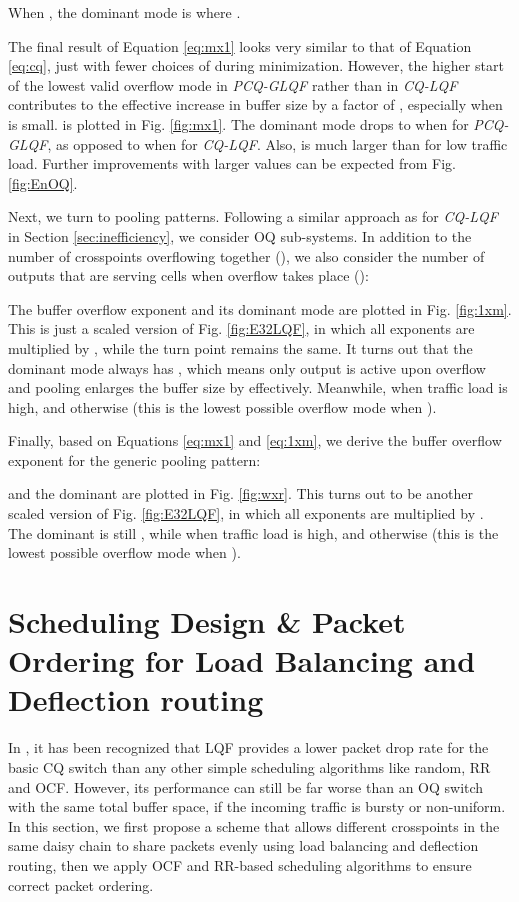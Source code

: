 \documentclass[journal,final,doublecolumn,10pt,twoside]{IEEEtranTCOM} \normalsize
\begin{document}
When , the dominant mode is  where .

The final result of Equation \ref{eq:mx1} looks very similar to that of Equation \ref{eq:cq}, just with fewer choices of  during minimization. However, the higher start of the lowest valid overflow mode  in \emph{PCQ-GLQF} rather than  in \emph{CQ-LQF} contributes to the effective increase in buffer size by a factor of , especially when  is small.  is plotted in Fig. \ref{fig:mx1}. The dominant mode drops to  when  for \emph{PCQ-GLQF}, as opposed to  when  for \emph{CQ-LQF}. Also,  is much larger than  for low traffic load. Further improvements with larger  values can be expected from Fig. \ref{fig:EnOQ}. 



Next, we turn to  pooling patterns. Following a similar approach as for \emph{CQ-LQF} in Section \ref{sec:inefficiency}, we consider OQ sub-systems. In addition to the number of crosspoints overflowing together (), we also consider the number of outputs that are serving cells when overflow takes place ():

The buffer overflow exponent  and its dominant mode  are plotted in Fig. \ref{fig:1xm}. This is just a scaled version of Fig. \ref{fig:E32LQF}, in which all exponents are multiplied by , while the turn point remains the same. It turns out that the dominant mode always has , which means only  output is active upon overflow and pooling enlarges the buffer size by  effectively. Meanwhile,  when traffic load is high, and  otherwise (this is the lowest possible overflow mode when ).

Finally, based on Equations \ref{eq:mx1} and \ref{eq:1xm}, we derive the buffer overflow exponent for the generic  pooling pattern:

 and the dominant  are plotted in Fig. \ref{fig:wxr}. This turns out to be another scaled version of Fig. \ref{fig:E32LQF}, in which all exponents are multiplied by . The dominant  is still , while  when traffic load is high, and  otherwise (this is the lowest possible overflow mode when ).






\section{Scheduling Design \& Packet Ordering for Load Balancing and Deflection routing} 
\label{sec:CCQ}

In \cite{cqs,radonjic01}, it has been recognized that LQF provides a lower packet drop rate for the basic CQ switch than any other simple scheduling algorithms like random, RR and OCF. However, its performance can still be far worse than an OQ switch with the same total buffer space, if the incoming traffic is bursty or non-uniform. In this section, we first propose a scheme that allows different crosspoints in the same daisy chain to share packets evenly using load balancing and deflection routing, then we apply OCF and RR-based scheduling algorithms to ensure correct packet ordering.
\end{document}
